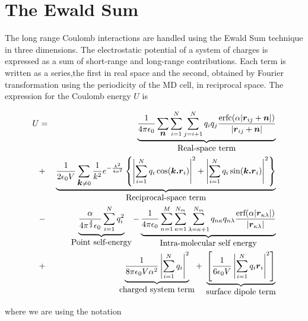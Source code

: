 \section{The Ewald Sum}%
\label{sec:ewald}
The long range Coulomb interactions are handled using the Ewald Sum
technique in three dimensions\cite[p.\ 156]{berthaut:52,allen:87}.
The electrostatic potential of a system of charges is expressed as a
sum of short-range and long-range contributions.  Each term is written
as a series,the first in real space and the second, obtained by
Fourier transformation using the periodicity of the MD cell, in
reciprocal space.  The expression for the Coulomb energy $U$ is

\begin{eqnarray}
\label{eqn:ewald}
U & = &  \underbrace{\frac{1}{4 \pi \epsilon_0}
\sum_{\mbox{\boldmath \protect\(n\protect\)}} \sum_{i=1}^{N} \sum_{j=i+1}^{N} q_iq_j
\frac{\mbox{erfc}( \alpha | \mbox{\boldmath \protect\(r\protect\)}_{ij} +  \mbox{\boldmath \protect\(n\protect\)} |)}{| \mbox{\boldmath \protect\(r\protect\)}_{ij} +
\mbox{\boldmath \protect\(n\protect\)} | }}_{\mbox{Real-space term}} 
\nonumber \\
 & + & \underbrace{\frac{1}{2 \epsilon_0 V} \sum_{\mbox{\boldmath \protect\(k\protect\)} \ne 0} \frac{1}{k^2}
       e^{-\frac{k^2}{4 \alpha^2}} 
\left \lbrace 
\left | \sum_{i=1}^{N} q_i \cos(\mbox{\boldmath \protect\(k.r\protect\)}_i) \right |^2 + 
\left | \sum_{i=1}^{N} q_i \sin(\mbox{\boldmath \protect\(k.r\protect\)}_i) \right |^2 
\right \rbrace}_{\mbox{Reciprocal-space term}}\\
 & - & 
\underbrace{\frac{\alpha}{4 \pi^\frac{3}{2} \epsilon_0} 
\sum_{i=1}^{N} q_i^2}_{\mbox{Point self-energy}} 
 - \underbrace{\frac{1}{4 \pi \epsilon_0} \sum_{n=1}^M
\sum_{\kappa=1}^{N_m} \sum_{\lambda=\kappa+1}^{N_m} q_{n\kappa} q_{n\lambda}
\frac{\mbox{erf}( \alpha | \mbox{\boldmath \protect\(r\protect\)}_{\kappa\lambda} |)}{|
\mbox{\boldmath \protect\(r\protect\)}_{\kappa\lambda}| }}_{\mbox{Intra-molecular self energy}}
\nonumber \\
& + & \underbrace{ \frac{1}{8 \pi \epsilon_0 V \alpha^2}
                    \left | \sum_{i=1}^N q_i 
                    \right |^2}_{\mbox{charged system term}} +
\; \underbrace{\left [  \frac{1}{6 \epsilon_0 V} 
                    \left | \sum_{i=1}^N q_i \mbox{\boldmath \protect\(r\protect\)}_i 
                    \right |^2 \right ]}_{\mbox{surface dipole term}}
\nonumber
\end{eqnarray}

where we are using the notation

